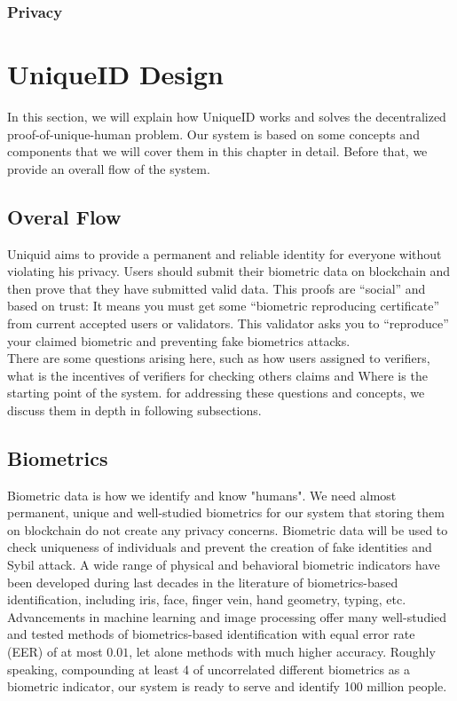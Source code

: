 \documentclass[conference]{IEEEtran}
\begin{document}
\subsubsection{Privacy}



\section{ UniqueID Design}
In this section, we will explain how UniqueID works and solves the decentralized proof-of-unique-human problem. Our system is based on some concepts and components that we will cover them in this chapter in detail. Before that, we provide an overall flow of the system.

\subsection{Overal Flow}

Uniquid aims to provide a permanent and reliable identity for everyone without violating his privacy.  Users should submit their biometric data on blockchain and then prove that they have submitted valid data. This proofs are “social” and based on trust: It means you must get some “biometric reproducing certificate” from current accepted users or validators. This validator asks you to “reproduce” your claimed biometric and preventing fake biometrics attacks.
\\
There are some questions arising here, such as how users assigned to verifiers, what is the incentives of verifiers for checking others claims and Where is the starting point of the system. for addressing these questions and concepts, we discuss them in depth in following subsections.
\subsection{Biometrics}
Biometric data is how we identify and know "humans". We need almost permanent, unique and well-studied biometrics for our system that storing them on blockchain do not create any privacy concerns. 
Biometric data will be used to check uniqueness of individuals and prevent the creation of fake identities and Sybil attack. A wide range of physical and behavioral biometric indicators have been developed during last decades in the literature of biometrics-based identification, including iris, face, finger vein, hand geometry, typing, etc. Advancements in machine learning and image processing offer many well-studied and tested methods of biometrics-based identification with equal error rate (EER) of at most $0.01$, let alone methods with much higher accuracy. Roughly speaking, compounding at least 4 of uncorrelated different biometrics as a biometric indicator, our system is ready to serve and identify 100 million people.\\
\end{document}
